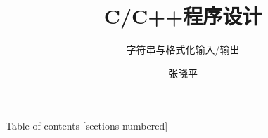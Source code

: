 \documentclass[10pt]{beamer}
\title{C/C++程序设计}
\subtitle{字符串与格式化输入/输出}
\date{}%
\author{张晓平}
\institute{武汉大学数学与统计学院}
\newcommand\Fontvi{\fontsize{6.5}{7.2}\selectfont}
\begin{document}
\maketitle

\begin{frame}{Table of contents}
  [sections numbered]
  \tableofcontents[hideallsubsections]
\end{frame}






\end{document}
